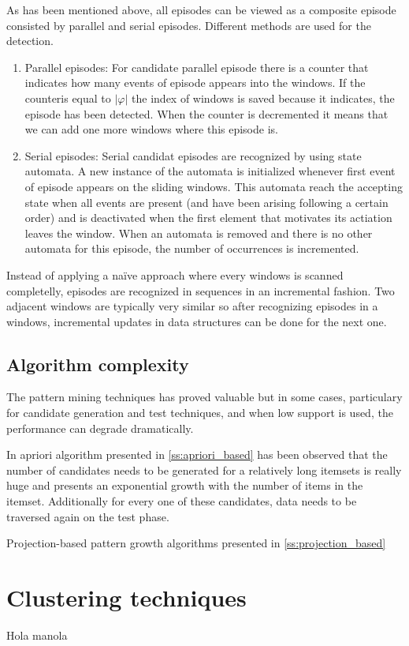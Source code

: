 As has been mentioned above, all episodes can be viewed as a composite episode
consisted by parallel and serial episodes. Different methods are used for the
detection. 
\begin{enumerate}[label=\roman*)]
  \item Parallel episodes: For candidate parallel episode there is a counter
    that indicates how many events of episode appears into the windows. If the
    counteris equal to $|\varphi|$ the index of windows is saved because it
    indicates, the episode has been detected. When the counter is decremented
    it means that we can add one more windows where this episode is.
  \item Serial episodes: Serial candidat episodes are recognized by using state
    automata. A new instance of the automata is initialized whenever first event
    of episode appears on the sliding windows. This automata reach the accepting
    state when all events are present (and have been arising following a certain
    order) and is deactivated when the first element
    that motivates its actiation leaves the window. When an automata is removed
    and there is no other automata for this episode, the number of occurrences
    is incremented.
\end{enumerate}

Instead of applying a naïve approach where every windows is scanned
completelly, episodes are recognized in sequences in an incremental fashion. 
Two adjacent windows are typically very similar so after
recognizing episodes in a windows, incremental updates in data structures can be
done for the next one.


\subsection{Algorithm complexity}


The pattern mining techniques has proved valuable but in some cases, particulary
for candidate generation and test techniques, and when low support is used, the
performance can degrade dramatically.

In apriori algorithm presented in \ref{ss:apriori_based} has been observed that
the number of candidates needs to be generated for a relatively long itemsets is
really huge and presents an exponential growth with the number of items in the
itemset. Additionally for every one of these candidates, data needs to be
traversed again on the test phase.

Projection-based pattern growth algorithms presented in
\ref{ss:projection_based}

\section{Clustering techniques}

Hola manola


